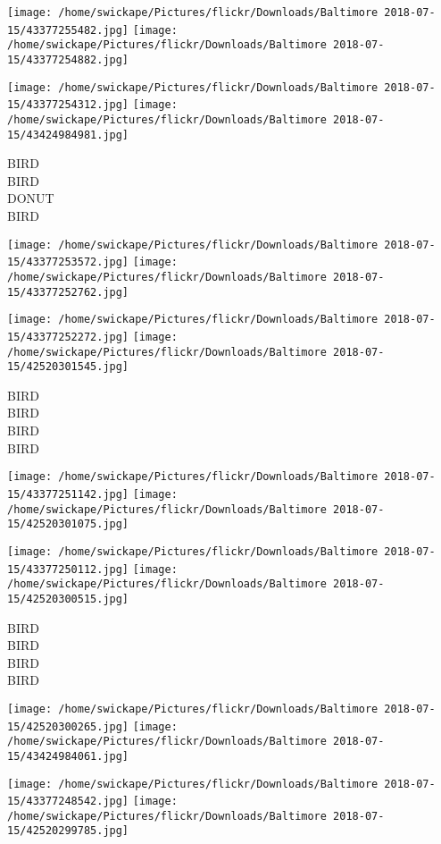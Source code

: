\documentclass[10pt,letterpaper]{article}
\begin{document}
\texttt{[image: /home/swickape/Pictures/flickr/Downloads/Baltimore 2018-07-15/43377255482.jpg]}
\texttt{[image: /home/swickape/Pictures/flickr/Downloads/Baltimore 2018-07-15/43377254882.jpg]}

\texttt{[image: /home/swickape/Pictures/flickr/Downloads/Baltimore 2018-07-15/43377254312.jpg]}
\texttt{[image: /home/swickape/Pictures/flickr/Downloads/Baltimore 2018-07-15/43424984981.jpg]}

BIRD\\
BIRD\\
DONUT\\
BIRD
\pagebreak

\texttt{[image: /home/swickape/Pictures/flickr/Downloads/Baltimore 2018-07-15/43377253572.jpg]}
\texttt{[image: /home/swickape/Pictures/flickr/Downloads/Baltimore 2018-07-15/43377252762.jpg]}

\texttt{[image: /home/swickape/Pictures/flickr/Downloads/Baltimore 2018-07-15/43377252272.jpg]}
\texttt{[image: /home/swickape/Pictures/flickr/Downloads/Baltimore 2018-07-15/42520301545.jpg]}

BIRD\\
BIRD\\
BIRD\\
BIRD
\pagebreak

\texttt{[image: /home/swickape/Pictures/flickr/Downloads/Baltimore 2018-07-15/43377251142.jpg]}
\texttt{[image: /home/swickape/Pictures/flickr/Downloads/Baltimore 2018-07-15/42520301075.jpg]}

\texttt{[image: /home/swickape/Pictures/flickr/Downloads/Baltimore 2018-07-15/43377250112.jpg]}
\texttt{[image: /home/swickape/Pictures/flickr/Downloads/Baltimore 2018-07-15/42520300515.jpg]}

BIRD\\
BIRD\\
BIRD\\
BIRD
\pagebreak

\texttt{[image: /home/swickape/Pictures/flickr/Downloads/Baltimore 2018-07-15/42520300265.jpg]}
\texttt{[image: /home/swickape/Pictures/flickr/Downloads/Baltimore 2018-07-15/43424984061.jpg]}

\texttt{[image: /home/swickape/Pictures/flickr/Downloads/Baltimore 2018-07-15/43377248542.jpg]}
\texttt{[image: /home/swickape/Pictures/flickr/Downloads/Baltimore 2018-07-15/42520299785.jpg]}
\end{document}
